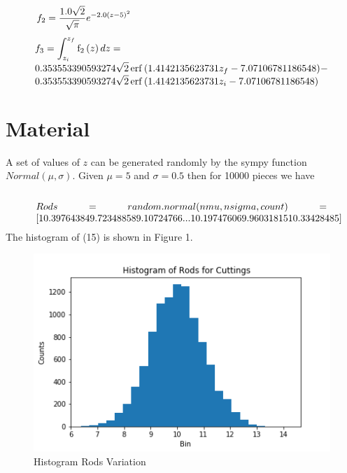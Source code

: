 \documentclass[10pt,a4paper]{article}
\begin{document}
\begin{equation}
\begin{minipage}{300pt}
 $\displaystyle f_{2} = \frac{1.0 \sqrt{2}}{\sqrt{\pi}} e^{- 2.0 \left(z - 5\right)^{2}}$  
\end{minipage}
\end{equation}
\begin{equation}
\begin{minipage}{300pt}
 $\displaystyle f_{3} = \int_{z_{i}}^{z_{f}} \operatorname{f_{2}}{\left (z \right )}\, dz = \\ 0.353553390593274 \sqrt{2} \operatorname{erf}{\left (1.4142135623731 z_{f} - 7.07106781186548 \right )} - 0.353553390593274 \sqrt{2} \operatorname{erf}{\left (1.4142135623731 z_{i} - 7.07106781186548 \right )}$  
\end{minipage}
\end{equation}
\noindent \section{Material}  A set of values of $z$ can be generated     randomly by the sympy function \\ $Normal(\mu, \sigma)$. Given  $\mu = 5 $ and $\sigma = 0.5 $ then for 10000 pieces we have \\ \\ 
\begin{equation}
\begin{minipage}{300pt}
 $\displaystyle Rods = random.normal(nmu, nsigma, count) = [10.39764384  9.72348858  9.10724766 ... 10.19747606  9.96031815
 10.33428485]$  
\end{minipage}
\end{equation}
\noindent The histogram of (15) is shown in Figure 1.
\begin{figure}[H]
\centering\includegraphics[width=1\linewidth,height=0.25\textheight]{Fig01}
\caption{Histogram Rods Variation}
\label{fig:Fig01}
\end{figure}
\end{document}
